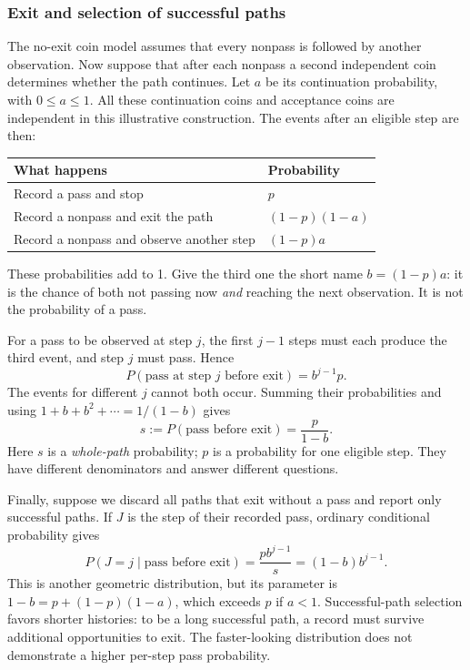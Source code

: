 \subsubsection{Exit and selection of successful paths}
The no-exit coin model assumes that every nonpass is followed by another observation. Now suppose that after each nonpass a second independent coin determines whether the path continues. Let $a$ be its continuation probability, with $0\le a\le1$. All these continuation coins and acceptance coins are independent in this illustrative construction. The events after an eligible step are then:
\begin{center}
\begin{tabularx}{\linewidth}{Yl}
\toprule
What happens & Probability \\
\midrule
Record a pass and stop & $p$ \\
Record a nonpass and exit the path & $(1-p)(1-a)$ \\
Record a nonpass and observe another step & $(1-p)a$ \\
\bottomrule
\end{tabularx}
\end{center}
These probabilities add to 1. Give the third one the short name $b=(1-p)a$: it is the chance of both not passing now \emph{and} reaching the next observation. It is not the probability of a pass.

For a pass to be observed at step $j$, the first $j-1$ steps must each produce the third event, and step $j$ must pass. Hence
\[
 P(\text{pass at step }j\text{ before exit})=b^{j-1}p.
\]
The events for different $j$ cannot both occur. Summing their probabilities and using $1+b+b^2+\cdots=1/(1-b)$ gives
\begin{equation}
 s:=P(\text{pass before exit})=\frac{p}{1-b}.
 \label{eq:pass-before-exit}
\end{equation}
Here $s$ is a \emph{whole-path} probability; $p$ is a probability for one eligible step. They have different denominators and answer different questions.

Finally, suppose we discard all paths that exit without a pass and report only successful paths. If $J$ is the step of their recorded pass, ordinary conditional probability gives
\begin{equation}
 P(J=j\mid\text{pass before exit})
 =\frac{p b^{j-1}}{s}=(1-b)b^{j-1}.
 \label{eq:selected-success-time}
\end{equation}
This is another geometric distribution, but its parameter is $1-b=p+(1-p)(1-a)$, which exceeds $p$ if $a<1$. Successful-path selection favors shorter histories: to be a long successful path, a record must survive additional opportunities to exit. The faster-looking distribution does not demonstrate a higher per-step pass probability.

